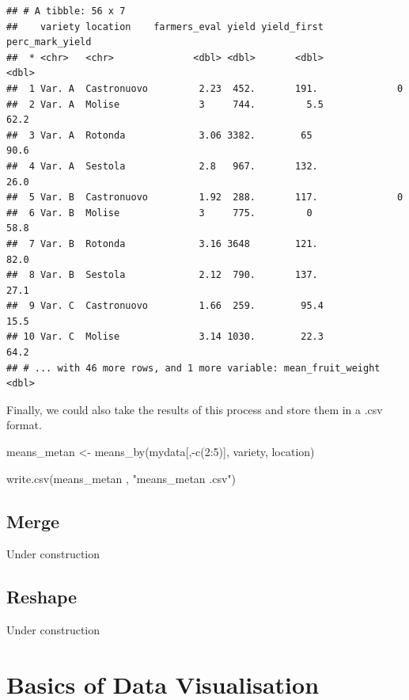 \documentclass[
]{book}
\newenvironment{Shaded}{\begin{snugshade}}{\end{snugshade}}
\newcommand{\DecValTok}[1]{\textcolor[rgb]{0.00,0.00,0.81}{#1}}
\newcommand{\FunctionTok}[1]{\textcolor[rgb]{0.00,0.00,0.00}{#1}}
\newcommand{\NormalTok}[1]{#1}
\newcommand{\OtherTok}[1]{\textcolor[rgb]{0.56,0.35,0.01}{#1}}
\newcommand{\SpecialCharTok}[1]{\textcolor[rgb]{0.00,0.00,0.00}{#1}}
\newcommand{\StringTok}[1]{\textcolor[rgb]{0.31,0.60,0.02}{#1}}
\begin{document}
\begin{verbatim}
## # A tibble: 56 x 7
##    variety location    farmers_eval yield yield_first perc_mark_yield
##  * <chr>   <chr>              <dbl> <dbl>       <dbl>           <dbl>
##  1 Var. A  Castronuovo         2.23  452.       191.              0  
##  2 Var. A  Molise              3     744.         5.5            62.2
##  3 Var. A  Rotonda             3.06 3382.        65              90.6
##  4 Var. A  Sestola             2.8   967.       132.             26.0
##  5 Var. B  Castronuovo         1.92  288.       117.              0  
##  6 Var. B  Molise              3     775.         0              58.8
##  7 Var. B  Rotonda             3.16 3648        121.             82.0
##  8 Var. B  Sestola             2.12  790.       137.             27.1
##  9 Var. C  Castronuovo         1.66  259.        95.4            15.5
## 10 Var. C  Molise              3.14 1030.        22.3            64.2
## # ... with 46 more rows, and 1 more variable: mean_fruit_weight <dbl>
\end{verbatim}

Finally, we could also take the results of this process and store them in a .csv format.

\begin{Shaded}
\begin{Highlighting}[]
\NormalTok{means\_metan }\OtherTok{\textless{}{-}} \FunctionTok{means\_by}\NormalTok{(mydata[,}\SpecialCharTok{{-}}\FunctionTok{c}\NormalTok{(}\DecValTok{2}\SpecialCharTok{:}\DecValTok{5}\NormalTok{)], variety, location)}

\FunctionTok{write.csv}\NormalTok{(means\_metan , }\StringTok{"means\_metan .csv"}\NormalTok{)}
\end{Highlighting}
\end{Shaded}

\hypertarget{merge}{%
\section{Merge}\label{merge}}

Under construction

\hypertarget{reshape}{%
\section{Reshape}\label{reshape}}

Under construction

\hypertarget{basics-of-data-visualisation}{%
\chapter{Basics of Data Visualisation}\label{basics-of-data-visualisation}}
\end{document}
